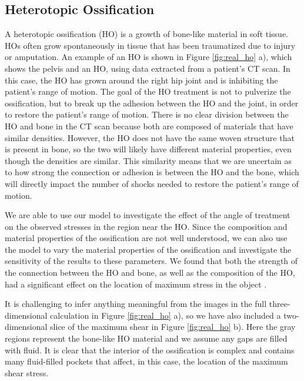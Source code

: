 \documentclass{article}
\begin{document}
\subsection{Heterotopic Ossification}
\label{sec:ho}
A heterotopic ossification (HO) is a growth of bone-like 
material in soft tissue.  HOs often grow spontaneously in tissue that has been traumatized due to injury or amputation.
An example of an HO is shown in Figure \ref{fig:real_ho} a), which shows the pelvis and an HO, using data extracted from a patient's CT scan.  In this case, the HO has grown around the right hip joint and is inhibiting the patient's range of motion.  The goal of the HO treatment is not to pulverize the ossification, but to break up the adhesion between the HO and the joint, in order to restore the patient's range of motion.  There is no clear division between the HO and bone in the CT scan because both are composed of materials that have similar densities.  However, the HO does not have the same woven structure that is present in bone, so the two will likely have different material properties, even though the densities are similar.  This similarity means that we are uncertain as to how strong the connection or adhesion is between the HO and the bone, which will directly impact the number of shocks needed to restore the patient's range of motion.  

  
We are able to use our model to investigate the effect of the angle of treatment on the observed stresses in the region near the HO.  Since the composition and material 
properties of the ossification are not well understood, we can also use the model to
vary the material properties of the ossification and investigate the sensitivity of the results to these parameters.  We found that both the strength of the connection between the HO and bone, as well as the composition of the HO, had a significant effect on the location of maximum 
stress in the object \cite{kfagnan_mchang_ho}.  

It is challenging to infer anything meaningful from the images in the full three-dimensional calculation in Figure \ref{fig:real_ho} a), so we have also included a two-dimensional slice of the maximum shear in Figure \ref{fig:real_ho} b).  Here the gray regions represent the bone-like HO material and we assume any gaps are filled with fluid.  It is clear that the interior of the ossification is complex and contains many fluid-filled pockets that affect, in this case, the location of the maximum shear stress.  
\end{document}
